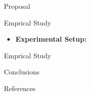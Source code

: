 \documentclass{beamer}
\begin{document}
\begin{frame}{Proposal}
\end{frame}

\begin{frame}{Emprical Study}
    \begin{itemize}
        \item \textbf{Experimental Setup:}
    \end{itemize}
\end{frame}

\begin{frame}{Emprical Study}
\end{frame}

\begin{frame}{Conclusions}
\end{frame}

\begin{frame}{References}
\end{frame}
\end{document}
